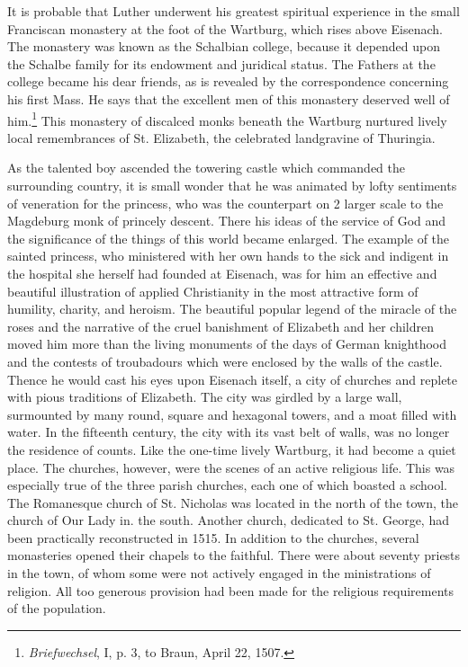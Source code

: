 It is probable that Luther underwent his greatest spiritual experience in the small Franciscan monastery at the foot of the Wartburg,
which rises above Eisenach. The monastery was known as the Schalbian college, because it depended upon the Schalbe family for its endowment and juridical status. The Fathers at the college became his
dear friends, as is revealed by the correspondence concerning his first
Mass. He says that the excellent men of this monastery deserved well
of him.\footnote{\textit{Briefwechsel}, I, p. 3, to Braun, April 22, 1507.}
This monastery of discalced monks beneath the Wartburg
nurtured lively local remembrances of St. Elizabeth, the celebrated
landgravine of Thuringia.

As the talented boy ascended the towering castle which commanded
the surrounding country, it is small wonder that he was animated by
lofty sentiments of veneration for the princess, who was the counterpart on 2 larger scale to the Magdeburg monk of princely descent.
There his ideas of the service of God and the significance of the things
of this world became enlarged. The example of the sainted princess,
who ministered with her own hands to the sick and indigent in the
hospital she herself had founded at Eisenach, was for him an effective
and beautiful illustration of applied Christianity in the most attractive form of humility, charity, and heroism. The beautiful popular
legend of the miracle of the roses and the narrative of the cruel banishment of Elizabeth and her children moved him more than the living
monuments of the days of German knighthood and the contests of
troubadours which were enclosed by the walls of the castle. Thence
he would cast his eyes upon Eisenach itself, a city of churches and replete with pious traditions of Elizabeth. The city was girdled by a
large wall, surmounted by many round, square and hexagonal towers,
and a moat filled with water. In the fifteenth century, the city with
its vast belt of walls, was no longer the residence of counts. Like the
one-time lively Wartburg, it had become a quiet place. The churches,
however, were the scenes of an active religious life. This was especially
true of the three parish churches, each one of which boasted a school.
The Romanesque church of St. Nicholas was located in the north of
the town, the church of Our Lady in. the south. Another church,
dedicated to St. George, had been practically reconstructed in 1515.
In addition to the churches, several monasteries opened their chapels
to the faithful. There were about seventy priests in the town, of whom
some were not actively engaged in the ministrations of religion. All
too generous provision had been made for the religious requirements
of the population.

